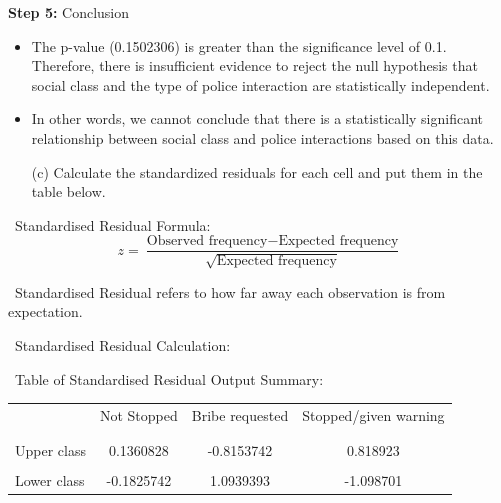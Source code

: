 \documentclass[12pt,letterpaper]{article}
\begin{document}
\vspace{0.5cm}
\noindent\textbf{Step 5:} Conclusion
\begin{itemize}
	\item 
	The p-value (0.1502306) is greater than the significance level of 0.1. Therefore, there is insufficient evidence to reject the null hypothesis that social class and the type of police interaction are statistically independent.
	\item
	In other words, we cannot conclude that there is a statistically significant relationship between social class and police interactions based on this data.
\end{itemize}

\newpage
\vspace{1cm}
\begin{enumerate}
\item [(c)] Calculate the standardized residuals for each cell and put them in the table below.
\end{enumerate}
\vspace{0.5cm}	
\noindent\ Standardised Residual Formula:
\vspace{0.5cm}
\[
z = \frac{\text{Observed frequency} - \text{Expected frequency}}{\sqrt{\text{Expected frequency}}}
\]

\vspace{0.5cm}
\noindent\ Standardised Residual refers to how far away each observation is from expectation. 
\vspace{0.5cm}

\noindent\ Standardised Residual Calculation:
\vspace{0.5cm}


\vspace{0.5cm}
\noindent\ Table of Standardised Residual Output Summary:
	\begin{table}[h]
		\centering
		\begin{tabular}{l | c c c }
			& Not Stopped & Bribe requested & Stopped/given warning \\
			\\[-1.8ex] 
			\hline \\[-1.8ex]
			Upper class  & 0.1360828  & -0.8153742 & 0.818923 \\
			\\
			Lower class & -0.1825742 & 1.0939393  &  -1.098701 \\
			
		\end{tabular}
	\end{table}
	
\end{document}

